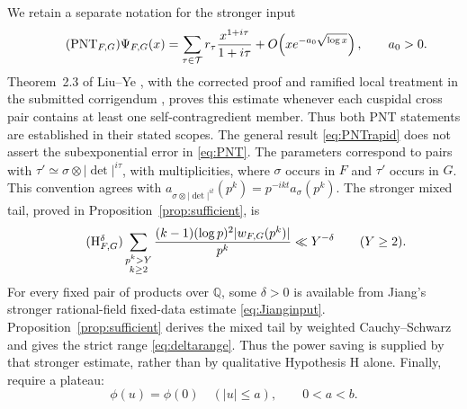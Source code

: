 \documentclass[11pt]{article}
\numberwithin{equation}{section}
\theoremstyle{remark}
\newcommand{\Q}{\mathbb Q}
\begin{document}
We retain a separate notation for the stronger input
\begin{equation*}\tag{$\mathrm{PNT}_{F,G}$}\label{eq:PNT}
 \Psi_{F,G}(x)
 =\sum_{\tau\in\mathcal T}r_\tau\frac{x^{1+i\tau}}{1+i\tau}
       +O\!\left(xe^{-a_0\sqrt{\log x}}\right),
 \qquad a_0>0.
\end{equation*}
Theorem~2.3 of Liu--Ye \cite{LY07}, with the corrected proof and
ramified local treatment in the submitted corrigendum \cite{Ycorr},
proves this estimate whenever each cuspidal cross pair contains at
least one self-contragredient member. Thus both PNT statements are
established in their stated scopes. The general result
\eqref{eq:PNTrapid} does not assert the subexponential error in
\eqref{eq:PNT}.
The parameters correspond to pairs with
$\tau'\simeq\sigma\otimes|\det|^{i\tau}$, with multiplicities, where
$\sigma$ occurs in $F$ and $\tau'$ occurs in $G$. This convention agrees
with $a_{\sigma\otimes|\det|^{it}}(p^k)=p^{-ikt}a_\sigma(p^k)$.
The stronger mixed tail, proved in Proposition~\ref{prop:sufficient}, is
\begin{equation*}\tag{$\mathrm H_{F,G}^{\delta}$}\label{eq:Hdelta}
 \sum_{\substack{p^k>Y\\k\geq2}}
 \frac{(k-1)(\log p)^2|w_{F,G}(p^k)|}{p^k}
       \ll Y^{-\delta}\qquad(Y\geq2).
\end{equation*}
For every fixed pair of products over $\Q$, some $\delta>0$ is
available from Jiang's stronger rational-field fixed-data estimate
\eqref{eq:Jianginput}. Proposition~\ref{prop:sufficient} derives the
mixed tail by weighted Cauchy--Schwarz and gives the strict range
\eqref{eq:deltarange}. Thus the power saving is supplied by that
stronger estimate, rather than by qualitative Hypothesis H alone.
Finally, require a plateau:
\begin{equation}\label{eq:plateau}
 \phi(u)=\phi(0)\quad (|u|\leq a),\qquad 0<a<b.
\end{equation}
\end{document}
